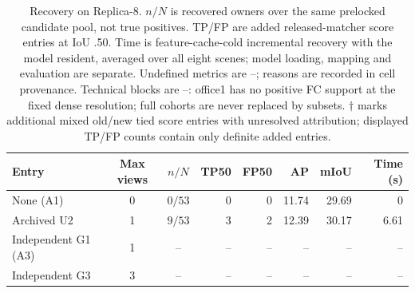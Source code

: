 \begin{table}[!ht]
\centering
\caption{Recovery on Replica-8. $n/N$ is recovered owners over the same prelocked candidate pool, not true positives. TP/FP are added released-matcher score entries at IoU .50. Time is feature-cache-cold incremental recovery with the model resident, averaged over all eight scenes; model loading, mapping and evaluation are separate. Undefined metrics are --; reasons are recorded in cell provenance. Technical blocks are --: office1 has no positive FC support at the fixed dense resolution; full cohorts are never replaced by subsets. $\dagger$ marks additional mixed old/new tied score entries with unresolved attribution; displayed TP/FP counts contain only definite added entries.}
\label{tab:recovery}
\fontsize{9}{10.5}\selectfont
\setlength{\tabcolsep}{4pt}
\begin{tabular*}{\textwidth}{@{\extracolsep{\fill}}lccrrrrr@{}}
\toprule
Entry & Max views & $n/N$ & TP50 & FP50 & AP & mIoU & Time (s) \\
\midrule
None (A1) & 0 & $0/53$ & 0 & 0 & 11.74 & 29.69 & 0 \\
Archived U2 & 1 & $9/53$ & 3 & 2 & 12.39 & 30.17 & 6.61 \\
Independent G1 (A3) & 1 & -- & -- & -- & -- & -- & -- \\
Independent G3 & 3 & -- & -- & -- & -- & -- & -- \\
\bottomrule
\end{tabular*}
\end{table}

